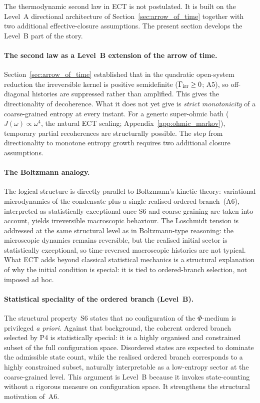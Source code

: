 \documentclass[11pt,a4paper]{article}
\numberwithin{equation}{section}
\begin{document}
The thermodynamic second law in ECT is not postulated.
It is built on the Level~A directional architecture of
Section~\ref{sec:arrow_of_time} together with two additional
effective-closure assumptions.
The present section develops the Level~B part of the story.

\paragraph{The second law as a Level~B extension of the arrow of time.}
Section~\ref{sec:arrow_of_time} established that in the quadratic
open-system reduction the irreversible kernel is positive semidefinite
($\Gamma_{\rm irr}\geq 0$; A5), so off-diagonal histories are
suppressed rather than amplified.
This gives the directionality of decoherence.
What it does not yet give is \emph{strict monotonicity} of a
coarse-grained entropy at every instant.
For a generic super-ohmic bath ($J(\omega)\propto\omega^4$, the
natural ECT scaling; Appendix~\ref{app:ohmic_markov}),
temporary partial recoherences are structurally possible.
The step from directionality to monotone entropy growth
requires two additional closure assumptions.

\paragraph{The Boltzmann analogy.}
The logical structure is directly parallel to Boltzmann's kinetic
theory: variational microdynamics of the condensate plus a single realised ordered
branch~(A6), interpreted as statistically exceptional once S6 and
coarse graining are taken into account, yields irreversible macroscopic
behaviour.
The Loschmidt tension is addressed at the same structural level as in
Boltzmann-type reasoning:
the microscopic dynamics remains reversible, but the realised initial
sector is statistically exceptional, so time-reversed macroscopic
histories are not typical.
What ECT adds beyond classical statistical mechanics is a structural
explanation of why the initial condition is special: it is tied to
ordered-branch selection, not imposed ad hoc.

\paragraph{Statistical speciality of the ordered branch (Level~B).}
The structural property~S6 states that no configuration of the
$\Phi$-medium is privileged \emph{a priori}.
Against that background, the coherent ordered branch selected by P4 is
statistically special: it is a highly organised and constrained subset
of the full configuration space.
Disordered states are expected to dominate the admissible state count,
while the realised ordered branch corresponds to a highly constrained
subset, naturally interpretable as a low-entropy sector at the
coarse-grained level.
This argument is Level~B because it invokes state-counting without a
rigorous measure on configuration space.
It strengthens the structural motivation of~A6.
\end{document}

